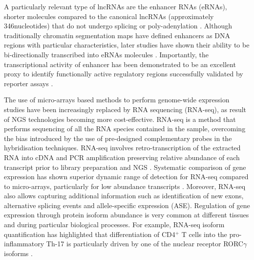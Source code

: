 A particularly relevant type of lncRNAs are the enhancer RNAs (eRNAs), shorter molecules compared to the canonical lncRNAs (approximately 346nucleotides) that do not undergo splicing or poly-adenylation \parencite{FANTOM2014}. Although traditionally chromatin segmentation maps have defined enhancers as DNA regions with particular characteristics, later studies have shown their ability to be bi-directionally transcribed into eRNAs molecules \parencite{De Santa2010, Kim2010}. Importantly, the transcriptional activity of enhancer has been demonstrated to be an excellent proxy to identify functionally active regulatory regions successfully validated by reporter assays \parencite{FANTOM2014, Anderssen2014}. 

The use of micro-arrays based methods to perform genome-wide expression studies have been increasingly replaced by RNA sequencing (RNA-seq), as result of NGS technologies becoming more cost-effective. RNA-seq is a method that performs sequencing of all the RNA species contained in the sample, overcoming the bias introduced by the use of pre-designed complementary probes in the hybridisation techniques. RNA-seq involves retro-transcription of the extracted RNA into cDNA and PCR amplification preserving relative abundance of each transcript prior to library preparation and NGS \parencite{Mortazavi2008}. Systematic comparison of gene expression has shown superior dynamic range of detection for RNA-seq compared to micro-arrays, particularly for low abundance transcripts \parencite{Zhao2014}. Moreover, RNA-seq also allows capturing additional information such as identification of new exons, alternative splicing events and allele-specific expression (ASE). %
Regulation of gene expression through protein isoform abundance is very common at different tissues and during particular biological processes. For example, RNA-seq isoform quantification has highlighted that differentiation of CD4$^+$ T cells into the pro-inflammatory Th-17 is particularly driven by one of the nuclear receptor RORC$\gamma$ isoforms \parencite{Zhao2014}. %
